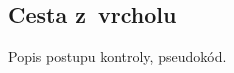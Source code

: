 \subsection{Cesta z~vrcholu}\label{subsec:cesta_z_vrcholu}

Popis postupu kontroly, pseudokód.

%
%
%
%
